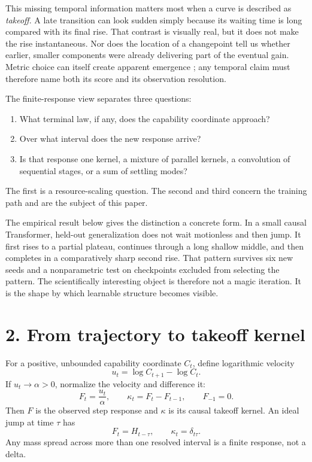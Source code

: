 \documentclass[10pt]{article}
\theoremstyle{compact}
\begin{document}
This missing temporal information matters most when a curve is described as
\emph{takeoff}. A late transition can look sudden simply because its waiting
time is long compared with its final rise. That contrast is visually real,
but it does not make the rise instantaneous. Nor does the location of a
changepoint tell us whether earlier, smaller components were already delivering
part of the eventual gain. Metric choice can itself create apparent emergence
\cite{schaeffer2023}; any temporal claim must therefore name both its score and
its observation resolution.

The finite-response view separates three questions:
\begin{questionbox}
\begin{enumerate}[
  leftmargin=1.8em,
  label=\textcolor{questionline}{\bfseries\arabic*.},
  labelsep=0.55em,
  itemsep=0.38em,
  topsep=0pt,
  parsep=0pt
]
\item What terminal law, if any, does the capability coordinate approach?
\item Over what interval does the new response arrive?
\item Is that response one kernel, a mixture of parallel kernels, a
convolution of sequential stages, or a sum of settling modes?
\end{enumerate}
\end{questionbox}
The first is a resource-scaling question. The second and third concern the
training path and are the subject of this paper.

The empirical result below gives the distinction a concrete form. In a small
causal Transformer, held-out generalization does not wait motionless and then
jump. It first rises to a partial plateau, continues through a long shallow
middle, and then completes in a comparatively sharp second rise. That pattern
survives six new seeds and a nonparametric test on checkpoints excluded from
selecting the pattern. The scientifically interesting object is therefore not
a magic iteration. It is the shape by which learnable structure becomes
visible.

\section*{2. From trajectory to takeoff kernel}

For a positive, unbounded capability coordinate \(C_t\), define logarithmic
velocity
\[
u_t=\log C_{t+1}-\log C_t.
\tag{1}
\]
If \(u_t\to\alpha>0\), normalize the velocity and difference it:
\[
F_t=\frac{u_t}{\alpha},
\qquad
\kappa_t=F_t-F_{t-1},
\qquad F_{-1}=0.
\tag{2}
\]
Then \(F\) is the observed step response and \(\kappa\) is its causal takeoff
kernel. An ideal jump at time \(\tau\) has
\[
F_t=H_{t-\tau},
\qquad
\kappa_t=\delta_{t\tau}.
\tag{3}
\]
Any mass spread across more than one resolved interval is a finite response,
not a delta.
\end{document}
